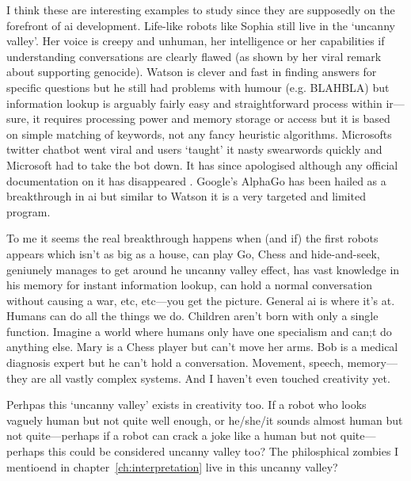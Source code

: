 I think these are interesting examples to study since they are supposedly on the forefront of \gls{ai} development. Life-like robots like Sophia still live in the `uncanny valley'. Her voice is creepy and unhuman, her intelligence or her capabilities if understanding conversations are clearly flawed (as shown by her viral remark about supporting genocide). Watson is clever and fast in finding answers for specific questions but he still had problems with humour (e.g. BLAHBLA) but information lookup is arguably fairly easy and straightforward process within \gls{ir}---sure, it requires processing power and memory storage or access but it is based on simple matching of keywords, not any fancy heuristic algorithms. Microsofts twitter chatbot went viral and users `taught' it nasty swearwords  quickly and Microsoft had to take the bot down. It has since apologised although any official documentation on it has disappeared . Google's AlphaGo has been hailed as a breakthrough in \gls{ai} but similar to Watson it is a very targeted and limited program. 

To me it seems the real breakthrough happens when (and if) the first robots appears which isn't as big as a house, can play Go, Chess and hide-and-seek, geniunely manages to get around he uncanny valley effect, has vast knowledge in his memory for instant information lookup, can hold a normal conversation without causing a war, etc, etc---you get the picture. General \gls{ai} is where it's at. Humans can do all the things we do. Children aren't born with only a single function. Imagine a world where humans only have one specialism and can;t do anything else. Mary is a Chess player but can't move her arms. Bob is a medical diagnosis expert but he can't hold a conversation. Movement, speech, memory---they are all vastly complex systems. And I haven't even touched creativity yet.

Perhpas this `uncanny valley' exists in creativity too. If a robot who looks vaguely human but not quite well enough, or he/she/it sounds almost human but not quite---perhaps if a robot can crack a joke like a human but not quite---perhaps this could be considered uncanny valley too? The philosphical zombies I mentioend in chapter~\ref{ch:interpretation} live in this uncanny valley?



